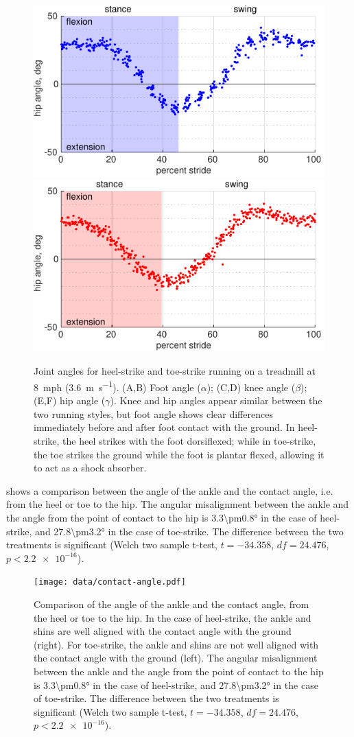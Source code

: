 \begin{figure}
\begin{center}
\includegraphics[width=0.49\columnwidth]{data/heel-hip-angle.pdf}
\includegraphics[width=0.49\columnwidth]{data/toe-hip-angle.pdf}
\end{center}
\caption{Joint angles for heel-strike and toe-strike running on a treadmill at \SI{8}{mph} (\SI{3.6}{\meter\per\second}). (A,B) Foot angle ($\alpha$); (C,D) knee angle ($\beta$); (E,F) hip angle ($\gamma$). Knee and hip angles appear similar between the two running styles, but foot angle shows clear differences immediately before and after foot contact with the ground. In heel-strike, the heel strikes with the foot dorsiflexed; while in toe-strike, the toe strikes the ground while the foot is plantar flexed, allowing it to act as a shock absorber.}
\label{fig:results:jointangles}
\end{figure}

 shows a comparison between the angle of the ankle and the contact angle, i.e. from the heel or toe to the hip. The angular misalignment between the ankle and the angle from the point of contact to the hip is \ang{3.3\pm0.8} in the case of heel-strike, and \ang{27.8\pm3.2} in the case of toe-strike. The difference between the two treatments is significant (Welch two sample t-test, $t=-34.358$, $df=24.476$, $p<\num{2.2e-16}$).
\begin{figure}
\begin{center}
\texttt{[image: data/contact-angle.pdf]}
\end{center}
\caption{Comparison of the angle of the ankle and the contact angle, from the heel or toe to the hip. In the case of heel-strike, the ankle and shins are well aligned with the contact angle with the ground (right). For toe-strike, the ankle and shins are not well aligned with the contact angle with the ground (left). The angular misalignment between the ankle and the angle from the point of contact to the hip is \ang{3.3\pm0.8} in the case of heel-strike, and \ang{27.8\pm3.2} in the case of toe-strike. The difference between the two treatments is significant (Welch two sample t-test, $t=-34.358$, $df=24.476$, $p<\num{2.2e-16}$).} 
\label{fig:results:contactangles}
\end{figure}

